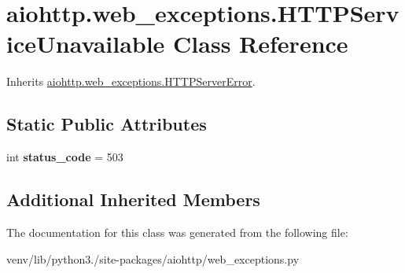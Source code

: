 \hypertarget{classaiohttp_1_1web__exceptions_1_1_h_t_t_p_service_unavailable}{}\section{aiohttp.\+web\+\_\+exceptions.\+H\+T\+T\+P\+Service\+Unavailable Class Reference}
\label{classaiohttp_1_1web__exceptions_1_1_h_t_t_p_service_unavailable}


Inherits \hyperlink{classaiohttp_1_1web__exceptions_1_1_h_t_t_p_server_error}{aiohttp.\+web\+\_\+exceptions.\+H\+T\+T\+P\+Server\+Error}.

\subsection*{Static Public Attributes}
\begin{DoxyCompactItemize}
\item 
\mbox{\label{classaiohttp_1_1web__exceptions_1_1_h_t_t_p_service_unavailable_a2ee36987d43dd285d93b04cb3c5a547c}} 
int {\bfseries status\+\_\+code} = 503
\end{DoxyCompactItemize}
\subsection*{Additional Inherited Members}


The documentation for this class was generated from the following file\+:\begin{DoxyCompactItemize}
\item 
venv/lib/python3./site-\/packages/aiohttp/web\+\_\+exceptions.\+py\end{DoxyCompactItemize}
